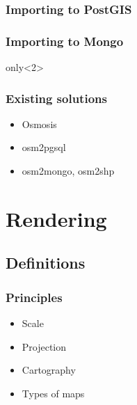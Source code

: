 \documentclass[14pt]{beamer}
\begin{document}
\begin{frame}
  \frametitle{Importing to PostGIS}
\end{frame}


\begin{frame}
  \frametitle{Importing to Mongo}
  only<2>{
    
  }
\end{frame}


\begin{frame}
  \frametitle{Existing solutions}
  \begin{itemize}
  \item Osmosis
  \item osm2pgsql
  \item osm2mongo, osm2shp
  \end{itemize}
\end{frame}


\section{Rendering}

\subsection{Definitions}
\label{sec:definitions-1}

\begin{frame}
  \frametitle{Principles}
  \begin{itemize}
  \item Scale
  \item Projection
  \item Cartography
  \item Types of maps
  \end{itemize}
\end{frame}
\end{document}

